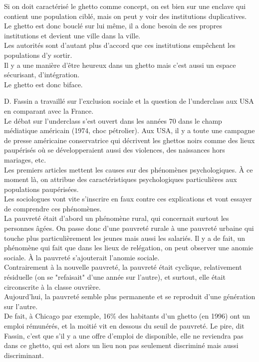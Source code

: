 \documentclass[10pt, a4paper, openany]{book}
\begin{document}
Si on doit caractérisé le ghetto comme concept, on est bien sur une enclave qui contient une population ciblé, mais on peut y voir des institutions duplicatives. Le ghetto est donc bouclé sur lui même, il a donc besoin de ses propres institutions et devient une ville dans la ville. \\
Les autorités sont d'autant plus d'accord que ces institutions empêchent les populations d'y sortir. \\
Il y a une manière d'être heureux dans un ghetto mais c'est aussi un espace sécurisant, d'intégration. \\
Le ghetto est donc biface. 


D. Fassin a travaillé sur l'exclusion sociale et la question de l'underclass aux USA en comparant avec la France. \\
Le débat sur l'underclass s'est ouvert dans les années 70 dans le champ médiatique américain (1974, choc pétrolier). Aux USA, il y a toute une campagne de presse américaine conservatrice qui décrivent les ghettos noirs comme des lieux paupérisés où se développeraient aussi des violences, des naissances hors mariages, etc. \\
Les premiers articles mettent les causes sur des phénomènes psychologiques. À ce moment là, on attribue des caractéristiques psychologiques particulières aux populations paupérisées. \\
Les sociologues vont vite s'inscrire en faux contre ces explications et vont essayer de comprendre ces phénomènes. \\
La pauvreté était d'abord un phénomène rural, qui concernait surtout les personnes âgées. On passe donc d'une pauvreté rurale à une pauvreté urbaine qui touche plus particulièrement les jeunes mais aussi les salariés. Il y a de fait, un phénomène qui fait que dans les lieux de relégation, on peut observer une anomie sociale. À la pauvreté s'ajouterait l'anomie sociale. \\
Contrairement à la nouvelle pauvreté, la pauvreté était cyclique, relativement résiduelle (on se "refaisait" d'une année sur l'autre), et surtout, elle était circonscrite à la classe ouvrière. \\
Aujourd'hui, la pauvreté semble plus permanente et se reproduit d'une génération sur l'autre. \\
De fait, à Chicago par exemple, 16\% des habitants d'un ghetto (en 1996) ont un emploi rémunérés, et la moitié vit en dessous du seuil de pauvreté. Le pire, dit Fassin, c'est que s'il y a une offre d'emploi de disponible, elle ne reviendra pas dans ce ghetto, qui est alors un lieu non pas seulement discriminé mais aussi discriminant. 
\end{document}
